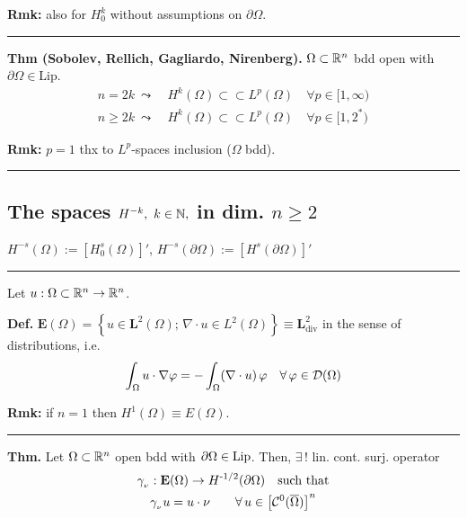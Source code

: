 \smallskip

\textbf{Rmk:} also for $H^k_0$ without assumptions on $\partial\Omega$.

\rule{0.31\textwidth}{0.2pt}
\smallskip

\textbf{Thm (Sobolev, Rellich, Gagliardo, Nirenberg).} $\Omega\subset \mathbb{R}^n$ bdd open with $\partial\Omega\in\text{Lip}$.
\begin{align*}
n=2k\ \leadsto\ &H^k(\Omega)\subset\subset L^p(\Omega)\quad \forall p\in [1,\infty) \\
n\geq 2k\ \leadsto\ &H^k(\Omega)\subset\subset L^p(\Omega)\quad \forall p\in [1,2^*)
\end{align*}

\smallskip

\textbf{Rmk:} $p=1$ thx to $L^p$-spaces inclusion ($\Omega$ bdd).

\rule{0.31\textwidth}{0.2pt}


\subsection{\texorpdfstring{\color{red}The spaces \texorpdfstring{$H^{-k},\ k\in\mathbb{N},$}{C} in dim. \texorpdfstring{$n\geq 2$}{C}}{}}


$H^{-s}(\Omega):=\left[ H^s_0(\Omega) \right]'$, $H^{-s}(\partial\Omega):=\left[ H^s(\partial\Omega) \right]'$

\rule{0.31\textwidth}{0.2pt}
\smallskip

Let $u:\Omega\subset\mathbb{R}^n\to\mathbb{R}^n$.

\smallskip

\textbf{Def.} $\mathbf{E}(\Omega)=\left\{ u\in \mathbf{L}^2(\Omega);\, \nabla\!\!\cdot\! u \in L^2(\Omega) \right\}\equiv \mathbf{L}^2_{\text{div}}$ in the sense of distributions, i.e.
\begin{equation*}
\int_\Omega u\cdot \nabla\varphi=-\int_\Omega (\nabla\cdot u)\, \varphi\quad\forall\,\varphi\in\mathcal{D}(\Omega)
\end{equation*}

\smallskip

\textbf{Rmk:} if $n=1$ then $H^1(\Omega)\equiv E(\Omega)$.

\rule{0.31\textwidth}{0.2pt}
\smallskip

\textbf{Thm.} Let $\Omega\subset\mathbb{R}^n$ open bdd with $\partial\Omega\in\operatorname{Lip}$. Then, $\exists\,!$ lin. cont. surj. operator 
\begin{gather*}
\gamma_{_\nu}:\mathbf{E}(\Omega)\to H^{\text{-}1/2}(\partial\Omega)\quad\text{such that} \\
\gamma_{_\nu} u=u\cdot\nu\qquad\forall\, u\in\left[\mathcal{C}^0(\overline{\Omega})\right]^n
\end{gather*}

